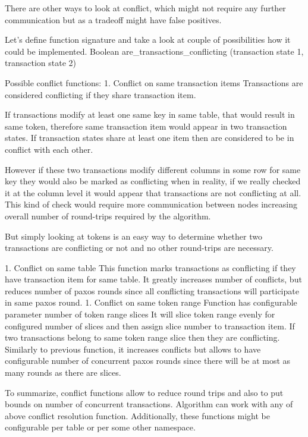 There are other ways to look at conflict, which might not require any further communication but as a tradeoff might have false positives. 


Let’s define function signature and take a look at couple of possibilities how it could be implemented.
Boolean are_transactions_conflicting (transaction state 1, transaction state 2)


Possible conflict functions:
1. Conflict on same transaction items
Transactions are considered conflicting if they share transaction item.


If transactions modify at least one same key in same table, that would result in same token, therefore same transaction item would appear in two transaction states. If transaction states share at least one item then are considered to be in conflict with each other.


However if these two transactions modify different columns in some row for same key they would also be marked as conflicting when in reality, if we really checked it at the column level it would appear that transactions are not conflicting at all. This kind of check would require more communication between nodes increasing overall number of round-trips required by the algorithm.


But simply looking at tokens is an easy way to determine whether two transactions are conflicting or not and no other round-trips are necessary.


1. Conflict on same table
        This function marks transactions as conflicting if they have transaction item for same table. It greatly increases number of conflicts, but reduces number of paxos rounds since all conflicting transactions will participate in same paxos round.
1. Conflict on same token range
        Function has configurable parameter number of token range slices
        It will slice token range evenly for configured number of slices and then assign slice number to transaction item. If two transactions belong to same token range slice then they are conflicting.
        Similarly to previous function, it increases conflicts but allows to have configurable number of concurrent paxos rounds since there will be at most as many rounds as there are slices.


To summarize, conflict functions allow to reduce round trips and also to put bounds on number of concurrent transactions. Algorithm can work with any of above conflict resolution function. Additionally, these functions might be configurable per table or per some other namespace. 




